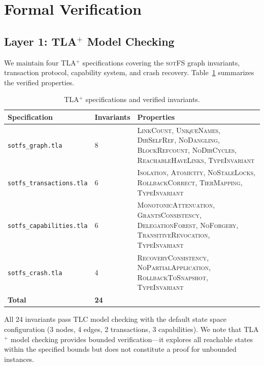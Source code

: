 \documentclass[11pt,a4paper]{article}
\theoremstyle{definition}
\theoremstyle{remark}
\newcommand{\sotfs}{\textsc{sotFS}}
\begin{document}
\section{Formal Verification}
\label{sec:verification}

\subsection{Layer 1: TLA$^+$ Model Checking}
\label{sec:verif-tla}

We maintain four TLA$^+$ specifications covering the \sotfs{} graph
invariants, transaction protocol, capability system, and crash
recovery. Table~\ref{tab:tla} summarizes the verified properties.

\begin{table}[H]
\centering
\caption{TLA$^+$ specifications and verified invariants.}
\label{tab:tla}
\small
\begin{tabular}{@{}llp{6.4cm}@{}}
\toprule
\textbf{Specification} & \textbf{Invariants} & \textbf{Properties} \\
\midrule
\texttt{sotfs\_graph.tla} & 8 &
  \textsc{LinkCount}, \textsc{UniqueNames},
  \textsc{DirSelfRef}, \textsc{NoDangling},
  \textsc{BlockRefcount}, \textsc{NoDirCycles},
  \textsc{ReachableHaveLinks}, \textsc{TypeInvariant} \\
\addlinespace
\texttt{sotfs\_transactions.tla} & 6 &
  \textsc{Isolation}, \textsc{Atomicity},
  \textsc{NoStaleLocks}, \textsc{RollbackCorrect},
  \textsc{TierMapping}, \textsc{TypeInvariant} \\
\addlinespace
\texttt{sotfs\_capabilities.tla} & 6 &
  \textsc{MonotonicAttenuation}, \textsc{GrantsConsistency},
  \textsc{DelegationForest}, \textsc{NoForgery},
  \textsc{TransitiveRevocation}, \textsc{TypeInvariant} \\
\addlinespace
\texttt{sotfs\_crash.tla} & 4 &
  \textsc{RecoveryConsistency},
  \textsc{NoPartialApplication},
  \textsc{RollbackToSnapshot}, \textsc{TypeInvariant} \\
\midrule
\textbf{Total} & \textbf{24} & \\
\bottomrule
\end{tabular}
\end{table}

All 24 invariants pass TLC model checking with the default state space
configuration (3 nodes, 4 edges, 2 transactions, 3 capabilities). We
note that TLA$^+$ model checking provides bounded verification---it
explores all reachable states within the specified bounds but does not
constitute a proof for unbounded instances.
\end{document}
